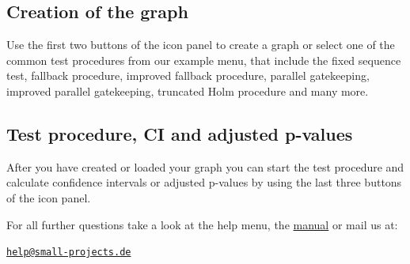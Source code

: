 \documentclass[a4paper, 11pt]{article}\usepackage[]{graphicx}\usepackage[]{color}
\begin{document}
\subsection*{Creation of the graph}

Use the first two buttons of the icon panel to create a graph or 
select one of the common test procedures from our example menu, that include the 
fixed sequence test, fallback procedure, improved fallback procedure, 
parallel gatekeeping, improved parallel gatekeeping, truncated Holm procedure and many more.

\subsection*{Test procedure, CI and adjusted p-values}

After you have created or loaded your graph you can start the test procedure and 
calculate confidence intervals or adjusted p-values by using the last three buttons of the icon panel.

For all further questions take a look at the help menu, the \href{http://cran.r-project.org/web/packages/gMCP/gMCP.pdf}{manual} or mail us at: 

\begin{center}\href{mailto:help@small-projects.de}{\texttt{help@small-projects.de}}\end{center}
\end{document}
